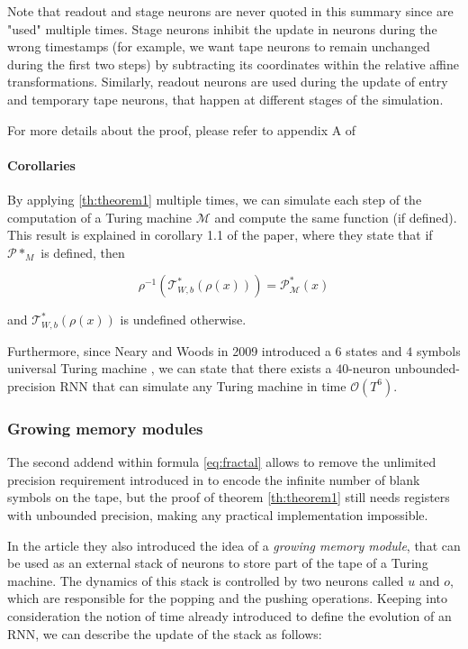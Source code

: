 \documentclass{article}
\begin{document}
Note that readout and stage neurons are never quoted in this summary since are "used" multiple times. Stage neurons inhibit the update in neurons during the wrong timestamps (for example, we want tape neurons to remain unchanged during the first two steps) by subtracting its coordinates within the relative affine transformations. Similarly, readout neurons are used during the update of entry and temporary tape neurons, that happen at different stages of the simulation.

For more details about the proof, please refer to appendix A of \cite{CHU21}

\paragraph{Corollaries}
By applying \ref{th:theorem1} multiple times, we can simulate each step of the computation of a Turing machine $\mathcal{M}$ and compute the same function (if defined). This result is explained in corollary 1.1 of the paper, where they state that if $\mathcal{P}*_{M}$ is defined, then

$$\rho^{-1}(\mathcal{T}^*_{W,b}(\rho(x))) = \mathcal{P}^*_{\mathcal{M}}(x)$$

and $\mathcal{T}^*_{W,b}(\rho(x))$ is undefined otherwise.

Furthermore, since Neary and Woods in 2009 introduced a $6$ states and $4$ symbols universal Turing machine \cite{NEA09}, we can state that there exists a $40$-neuron unbounded-precision RNN that can simulate any Turing machine in time $\mathcal{O}(T^6)$.

\subsubsection{Growing memory modules}\label{sec:growingmodules}
The second addend within formula \ref{eq:fractal} allows to remove the unlimited precision requirement introduced in \cite{SIE95} to encode the infinite number of blank symbols on the tape, but the proof of theorem \ref{th:theorem1} still needs registers with unbounded precision, making any practical implementation impossible.

In the article they also introduced the idea of a \textit{growing memory module}, that can be used as an external stack of neurons to store part of the tape of a Turing machine. The dynamics of this stack is controlled by two neurons called $u$ and $o$, which are responsible for the popping and the pushing operations. Keeping into consideration the notion of time already introduced to define the evolution of an RNN, we can describe the update of the stack as follows:
\end{document}
